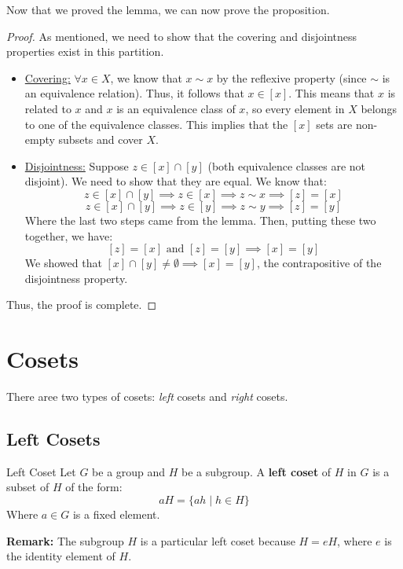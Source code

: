 \documentclass[letterpaper]{article}
\begin{document}
Now that we proved the lemma, we can now prove the proposition. 
\begin{mdframed}
    \begin{proof}
        As mentioned, we need to show that the covering and disjointness properties exist in this partition.
        \begin{itemize}
            \item \underline{Covering:} $\forall x \in X$, we know that $x \sim x$ by the reflexive property (since $\sim$ is an equivalence relation). Thus, it follows that $x \in [x]$. This means that $x$ is related to $x$ and $x$ is an equivalence class of $x$, so every element in $X$ belongs to one of the equivalence classes. This implies that the $[x]$ sets are non-empty subsets and cover $X$.
            \item \underline{Disjointness:} Suppose $z \in [x] \cap [y]$ (both equivalence classes are not disjoint). We need to show that they are equal. We know that:
            \[z \in [x] \cap [y] \implies z \in [x] \implies z \sim x \implies [z] = [x]\]
            \[z \in [x] \cap [y] \implies z \in [y] \implies z \sim y \implies [z] = [y]\]
            Where the last two steps came from the lemma. Then, putting these two together, we have:
            \[[z] = [x] \text{ and } [z] = [y] \implies [x] = [y]\]
            We showed that $[x] \cap [y] \neq \emptyset \implies [x] = [y]$, the contrapositive of the disjointness property. 
        \end{itemize}
        Thus, the proof is complete. 
    \end{proof}
\end{mdframed}











\newpage 
\section{Cosets}
There aree two types of cosets: \emph{left} cosets and \emph{right} cosets. 

\subsection{Left Cosets}
\begin{definition}{Left Coset}{}
    Let $G$ be a group and $H$ be a subgroup. A \textbf{left coset} of $H$ in $G$ is a subset of $H$ of the form:  
    \[aH = \{ah \mid h \in H\}\]
    Where $a \in G$ is a fixed element. 
\end{definition}
\textbf{Remark:} The subgroup $H$ is a particular left coset because $H = eH$, where $e$ is the identity element of $H$. 
\end{document}
